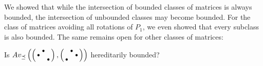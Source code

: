 We showed that while the intersection of bounded classes of matrices is always bounded, the intersection of unbounded classes may become bounded. For the class of matrices avoiding all rotations of $P_1$, we even showed that every subclass is also bounded. The same remains open for other classes of matrices:
\begin{ques}
Is $Av_{\preceq}\left(\left(\begin{smallmatrix} &\bullet& \\\bullet& & \\ & &\bullet\end{smallmatrix}\right),\left(\begin{smallmatrix} &\bullet& \\ & &\bullet\\\bullet& & \end{smallmatrix}\right)\right)$ hereditarily bounded?
\end{ques}